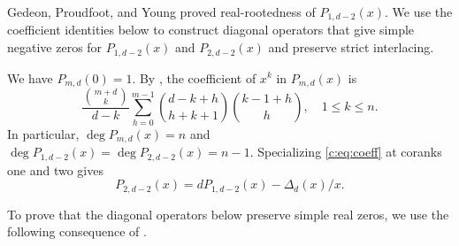 \documentclass[10pt,a4paper]{article}
\numberwithin{equation}{section}
\theoremstyle{remark}\newtheorem{remark}[theorem]{Remark}
\begin{document}
Gedeon, Proudfoot, and Young \cite[Theorem~3.3]{GPY} proved
real-rootedness of $P_{1,d-2}(x)$. We use the coefficient identities
below to construct diagonal operators that give simple negative zeros for
$P_{1,d-2}(x)$ and $P_{2,d-2}(x)$ and preserve strict interlacing.

We have $P_{m,d}(0)=1$. By \cite[Theorem 1.3]{GLXYZ}, the coefficient
of $x^k$ in $P_{m,d}(x)$ is
\begin{equation}\label{c:eq:coeff}
 \frac{\binom{m+d}{k}}{d-k}
 \sum_{h=0}^{m-1}\binom{d-k+h}{h+k+1}\binom{k-1+h}{h},
 \quad1\le k\le n.
\end{equation}
In particular, $\deg P_{m,d}(x)=n$ and
$\deg P_{1,d-2}(x)=\deg P_{2,d-2}(x)=n-1$.
Specializing \eqref{c:eq:coeff} at coranks one and two gives
\begin{equation}\label{c:eq:Kidentity}
 P_{2,d-2}(x)=dP_{1,d-2}(x)-\Delta_d(x)/x.
\end{equation}

To prove that the diagonal operators below preserve simple real
zeros, we use the following consequence of
\cite[Theorem 3.1]{CC}.
\end{document}
